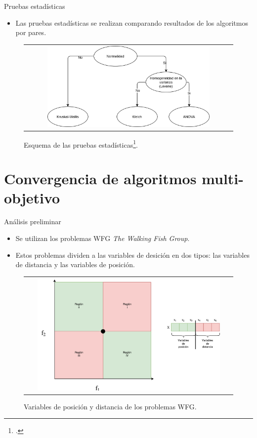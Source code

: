 \documentclass{beamer}
\begin{document}
\begin{frame}{Pruebas estadísticas}
\begin{itemize}
\item Las pruebas estadísticas se realizan comparando resultados de los algoritmos por pares.
\end{itemize}
\begin{figure}[H]
\begin{tabular}{c}
\includegraphics[width=0.8\textwidth]{Tests.png}
\end{tabular}
\centering
\caption{\scriptsize Esquema de las pruebas estadísticas\footcite{Joel:StatisticalTest}.}
\end{figure}

\end{frame}


\section{Convergencia de algoritmos multi-objetivo}


\begin{frame}{Análisis preliminar}
\begin{itemize}
\scriptsize
\justifying
\item Se utilizan los problemas WFG \textit{The Walking Fish Group}.
\justifying
\item Estos problemas dividen a las variables de desición en dos tipos: las variables de distancia y las variables de posición.
\end{itemize}
\begin{figure}
\centering
\begin{tabular}{c}
 \includegraphics[width=0.9\textwidth]{Parametros_Posicion_Distancia.pdf}   \\
\end{tabular}
\caption{Variables de posición y distancia de los problemas WFG.}
\end{figure}
\end{frame}
\end{document}
